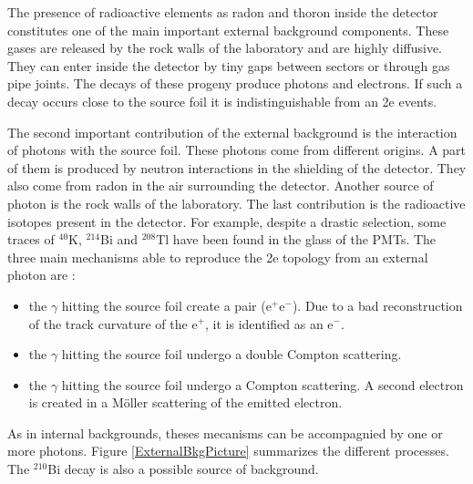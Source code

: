 \documentclass[main.tex]{subfiles}
\begin{document}
\NI The presence of radioactive elements as radon and thoron inside the detector constitutes one of the main important external background components. These gases are released by the rock walls of the laboratory and are highly diffusive. They can enter inside the detector by tiny gaps between sectors or through gas pipe joints. The decays of these progeny produce photons and electrons. If such a decay occurs close to the source foil it is indistinguishable from an 2e events.


\bigskip


\NI The second important contribution of the external background is the interaction of photons with the source foil. These photons come from different origins. A part of them is produced by neutron interactions in the shielding of the detector. They also come from radon in the air surrounding the detector. Another source of photon is the rock walls of the laboratory. The last contribution is the radioactive isotopes present in the detector. For example, despite a drastic selection, some traces of $^{\text{40}}$K, $^{\text{214}}$Bi and $^{\text{208}}$Tl have been found in the glass of the PMTs. The three main mechanisms able to reproduce the 2e topology from an external photon are :   


\begin{itemize}
\item the $\gamma$ hitting the source foil create a pair (e$^+$e$^-$). Due to a bad reconstruction of the track curvature of the e$^+$, it is identified as an e$^-$.
\item the $\gamma$ hitting the source foil undergo a double Compton scattering.
\item the $\gamma$ hitting the source foil undergo a Compton scattering. A second electron is created in a M\"oller scattering of the emitted electron.
\end{itemize} 


\NI As in internal backgrounds, theses mecanisms can be accompagnied by one or more photons. Figure \ref{ExternalBkgPicture}  summarizes the different processes. The $^{\text{210}}$Bi decay is also a possible source of background.
\end{document}
